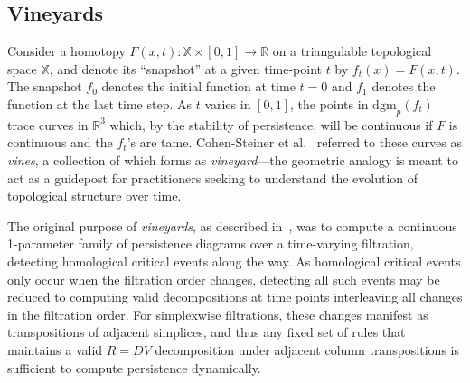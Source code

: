 \documentclass[sn-mathphys]{sn-jnl}
\begin{document}
\subsection{Vineyards}\label{sec:vineyards}
\vspace{-0.5em}
Consider a homotopy $F(x,t) : \mathbb{X} \times [0,1] \to \mathbb{R}$ on a triangulable topological space $\mathbb{X}$, and denote its ``snapshot'' at a given time-point $t$ by $f_t(x) = F(x,t)$.
The snapshot $f_0$ denotes the initial function at time $t = 0$ and $f_1$ denotes the function at the last time step. 
As $t$ varies in $[0,1]$, the points in $\mathrm{dgm}_p(f_t)$ trace curves in $\mathbb{R}^3$ which, by the stability of persistence, will be continuous if $F$ is continuous and the $f_t$'s are tame.
Cohen-Steiner et al.~\cite{cohen2007stability} referred to these curves as \emph{vines}, a collection of which forms as \emph{vineyard}---the geometric analogy is meant to act as a guidepost for practitioners seeking to understand the evolution of topological structure over time.

The original purpose of \emph{vineyards}, as described in~\cite{cohen2006vines}, was to compute a continuous 1-parameter family of persistence diagrams over a time-varying filtration, detecting homological critical events along the way.
As homological critical events only occur when the filtration order changes, detecting all such events may be reduced to computing valid decompositions at   time points interleaving all changes in the filtration order. 
For simplexwise filtrations, these changes manifest as transpositions of adjacent simplices, and thus any fixed set of rules that maintains a valid $R = D V$ decomposition under adjacent column transpositions is sufficient to compute persistence dynamically. 
\end{document}
